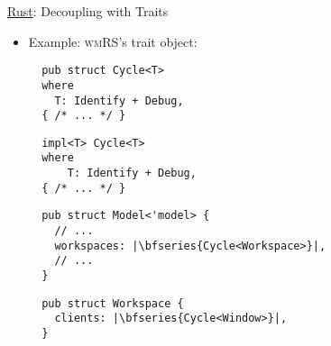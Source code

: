 \begin{frame}[fragile]{\underline{Rust}: Decoupling with Traits \hfill {\footnotesize \currentname}}


    \begin{itemize}

        \item Example: \textsc{wmRS}'s  trait object:\\[3pt]
\begin{minipage}{.45\linewidth}
\begin{verbatim}
  pub struct Cycle<T>
  where
    T: Identify + Debug,
  { /* ... */ }
\end{verbatim}
\begin{verbatim}
  impl<T> Cycle<T>
  where
      T: Identify + Debug,
  { /* ... */ }
\end{verbatim}
\end{minipage}%
\begin{minipage}{.40\linewidth}
\begin{verbatim}
  pub struct Model<'model> {
    // ...
    workspaces: |\bfseries{Cycle<Workspace>}|,
    // ...
  }
\end{verbatim}
\begin{verbatim}
  pub struct Workspace {
    clients: |\bfseries{Cycle<Window>}|,
  }
\end{verbatim}
\end{minipage}

    \end{itemize}

    \vfill

\end{frame}
